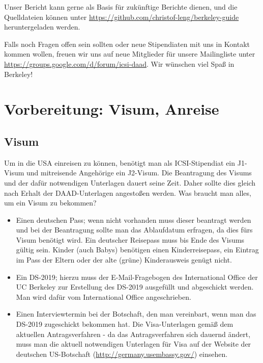 \documentclass[a4paper]{scrreprt}
\begin{document}
Unser Bericht kann gerne als Basis für zukünftige Berichte dienen,
und die Quelldateien können unter \url{https://github.com/christof-leng/berkeley-guide} heruntergeladen werden.

Falls noch Fragen offen sein sollten oder neue Stipendiaten mit uns in Kontakt kommen wollen,
freuen wir uns auf neue Mitglieder für unsere Mailingliste unter \url{https://groups.google.com/d/forum/icsi-daad}.
Wir wünschen viel Spaß in Berkeley!

\tableofcontents
 
\chapter{Vorbereitung: Visum, Anreise}

\section{Visum}

Um in die USA einreisen zu können, benötigt man als ICSI-Stipendiat ein J1-Visum und mitreisende Angehörige ein J2-Visum. Die Beantragung des Visums und der dafür notwendigen Unterlagen dauert seine Zeit. Daher sollte dies gleich nach Erhalt der DAAD-Unterlagen angestoßen werden. Was braucht man alles, um ein Visum zu bekommen?

\begin{itemize}

  \item Einen deutschen Pass; wenn nicht vorhanden muss dieser beantragt werden und bei der Beantragung sollte man das Ablaufdatum erfragen, da dies fürs Visum benötigt wird. Ein deutscher Reisepass muss bis Ende des Visums gültig sein. Kinder (auch Babys) benötigen einen Kinderreisepass, ein Eintrag im Pass der Eltern oder der alte (grüne) Kinderausweis genügt nicht.

	\item Ein DS-2019; hierzu muss der E-Mail-Fragebogen des International Office der UC Berkeley zur Erstellung des DS-2019 ausgefüllt und abgeschickt werden. Man wird dafür vom International Office angeschrieben.
	
	\item Einen Interviewtermin bei der Botschaft, den man vereinbart, wenn man das DS-2019 zugeschickt bekommen hat. Die Visa-Unterlagen gemäß dem aktuellen Antragsverfahren - da das Antragsverfahren sich dauernd ändert, muss man die aktuell notwendigen Unterlagen für Visa auf der Website der deutschen US-Botschaft (\url{http://germany.usembassy.gov/}) einsehen.

\end{itemize}
\end{document}
